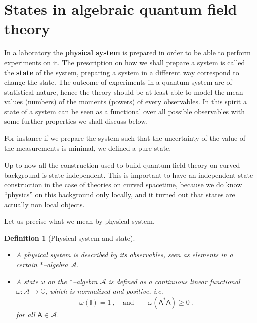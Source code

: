 \documentclass[11pt]{book}
\newcommand{\Acal}{\mathcal{A}}
\newcommand{\Cbb}{\mathbb{C}}
\newcommand{\Ibb}{\mathbb{I}}
\newcommand{\Asf}{\mathsf{A}}
\theoremstyle{break}
\newtheorem{definition}{Definition}[chapter]
\begin{document}
\section{States in algebraic quantum field theory}
\label{p:STATES}


In a laboratory the \textbf{physical system} is prepared in order to be able to perform experiments on it. The prescription on how we shall prepare a system is called the \textbf{state} of the system, preparing a system in a different way correspond to change the state. The outcome of experiments in a quantum system are of statistical nature, hence the theory should be at least able to model the mean values (numbers) of the moments (powers) of every observables. In this spirit a state of a system can be seen as a functional over all possible observables with some further properties we shall discuss below.


For instance if we prepare the system such that the uncertainty of the value of the measurements is minimal, we defined a pure state. 


Up to now all the construction used to build quantum field theory on curved background is state independent. This is important to have an independent state construction in the case of theories on curved spacetime, because we do know ``physics''  on this background only locally, and it turned out that states are actually non local objects.


Let us precise what we mean by physical system.


\begin{definition}[Physical system and state] 
\begin{itemize}
\item A physical system is described by its observables, seen as elements in a certain $\ast$--algebra $\Acal$.
%
\item A state $\omega$ on the $\ast$--algebra $\Acal$ is defined as a continuous linear functional $\omega : \Acal \to \Cbb$, which is normalized and positive, i.e.
%
\begin{equation*}
\omega(\Ibb) =  1 \ , \quad \mbox{and} \qquad \omega(\Asf^\ast \Asf) \geq 0 \ . 
\end{equation*}
%
for all $\Asf \in \Acal$.
\end{itemize}
\end{definition}
\end{document}
